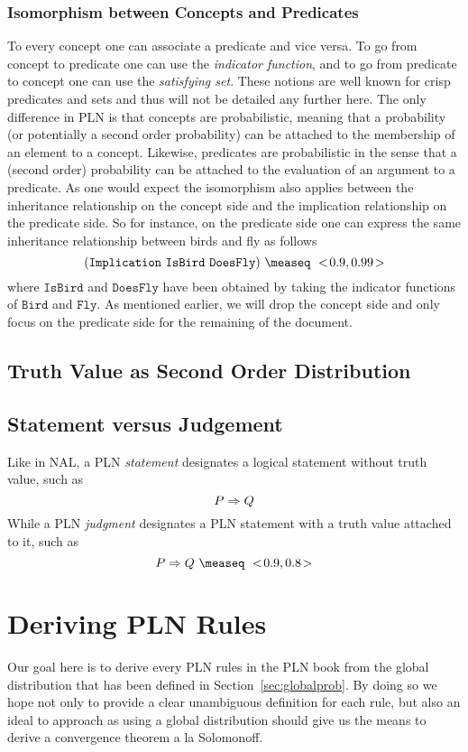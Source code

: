 \documentclass[]{article}
\begin{document}
\subsubsection{Isomorphism between Concepts and Predicates}
To every concept one can associate a predicate and vice versa.  To go
from concept to predicate one can use the \emph{indicator function},
and to go from predicate to concept one can use the \emph{satisfying
set}.  These notions are well known for crisp predicates and sets and
thus will not be detailed any further here.  The only difference in
PLN is that concepts are probabilistic, meaning that a probability (or
potentially a second order probability) can be attached to the
membership of an element to a concept.  Likewise, predicates are
probabilistic in the sense that a (second order) probability can be
attached to the evaluation of an argument to a predicate.  As one
would expect the isomorphism also applies between the inheritance
relationship on the concept side and the implication relationship on
the predicate side.  So for instance, on the predicate side one can
express the same inheritance relationship between birds and fly as
follows
$$(\texttt{Implication}\ \texttt{IsBird}\ \texttt{DoesFly})\ \measeq\ \STV{0.9}{0.99}$$
where $\texttt{IsBird}$ and $\texttt{DoesFly}$ have been obtained by
taking the indicator functions of $\texttt{Bird}$ and $\texttt{Fly}$.
As mentioned earlier, we will drop the concept side and only focus on
the predicate side for the remaining of the document.

\subsection{Truth Value as Second Order Distribution}
\label{sec:truthvalue}

\subsection{Statement versus Judgement}
\label{sec:statjudge}
Like in NAL, a PLN \emph{statement} designates a logical statement
without truth value, such as
$$P \Rightarrow Q$$ While a PLN \emph{judgment} designates a PLN statement
with a truth value attached to it, such as
$$P \limp Q\ \measeq\ \STV{0.9}{0.8}$$

\section{Deriving PLN Rules}
\label{sec:derules}
Our goal here is to derive every PLN rules in the PLN book from the
global distribution that has been defined in
Section~\ref{sec:globalprob}.  By doing so we hope not only to
provide a clear unambiguous definition for each rule, but also an
ideal to approach as using a global distribution should give us the
means to derive a convergence theorem a la Solomonoff.
\end{document}
